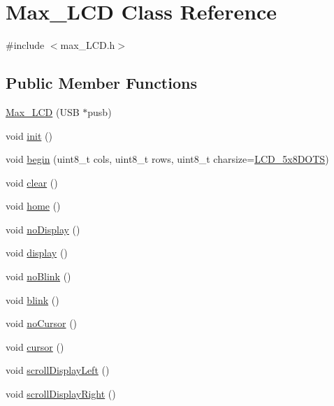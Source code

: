 \hypertarget{class_max___l_c_d}{\section{\-Max\-\_\-\-L\-C\-D \-Class \-Reference}
\label{class_max___l_c_d}
}


{\ttfamily \#include $<$max\-\_\-\-L\-C\-D.\-h$>$}

\subsection*{\-Public \-Member \-Functions}
\begin{DoxyCompactItemize}
\item 
\hyperlink{class_max___l_c_d_a902acb941a977da0b3f7b805be4d3bd4}{\-Max\-\_\-\-L\-C\-D} (\-U\-S\-B $\ast$pusb)
\item 
void \hyperlink{class_max___l_c_d_a3205e9a432c808422867c1398d665247}{init} ()
\item 
void \hyperlink{class_max___l_c_d_ac8ea275f8e9e27fb98ed21100f10fab7}{begin} (uint8\-\_\-t cols, uint8\-\_\-t rows, uint8\-\_\-t charsize=\hyperlink{max___l_c_d_8h_a9ef57e724c1b846dae0f531aff6fb464}{\-L\-C\-D\-\_\-5x8\-D\-O\-T\-S})
\item 
void \hyperlink{class_max___l_c_d_a6c70568796774cf2ce912de989f2dbf0}{clear} ()
\item 
void \hyperlink{class_max___l_c_d_ab98bf9ee1a2bc7705e2fc425ef26b13b}{home} ()
\item 
void \hyperlink{class_max___l_c_d_ab865f37d0df98270e5ea3c4fb0f28a80}{no\-Display} ()
\item 
void \hyperlink{class_max___l_c_d_a9eeefc04930595cc168129d159547124}{display} ()
\item 
void \hyperlink{class_max___l_c_d_a2469e6d8f2959728b35f04eacb23cd29}{no\-Blink} ()
\item 
void \hyperlink{class_max___l_c_d_aa25fa75294a10b24b7359d6886b8f0ab}{blink} ()
\item 
void \hyperlink{class_max___l_c_d_acafae0286b5fb7790f5694d17c1af85d}{no\-Cursor} ()
\item 
void \hyperlink{class_max___l_c_d_a5e8b86cd4c8638149d97574c03ded405}{cursor} ()
\item 
void \hyperlink{class_max___l_c_d_af5c3a45b45470fa3f274467521512759}{scroll\-Display\-Left} ()
\item 
void \hyperlink{class_max___l_c_d_adee56aad25a1301b4beae69251450190}{scroll\-Display\-Right} ()
\item 

\end{DoxyCompactItemize}
